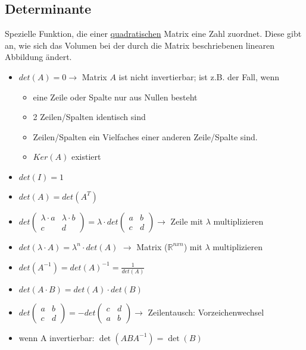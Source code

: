 \subsection{Determinante}

Spezielle Funktion, die einer \underline{quadratischen} Matrix eine Zahl zuordnet. Diese gibt an, wie sich das Volumen bei der durch die Matrix beschriebenen linearen Abbildung ändert. \\


\begin{minipage}{0.65\textwidth}
\begin{itemize}
    \item \(det(A)= 0\rightarrow\) Matrix \(A\) ist nicht invertierbar; ist z.B. der Fall, wenn
    \begin{itemize}
        \item eine Zeile oder Spalte nur aus Nullen besteht
        \item 2 Zeilen/Spalten identisch sind
        \item Zeilen/Spalten ein Vielfaches einer anderen Zeile/Spalte sind.
        \item \(Ker(A)\) existiert
    \end{itemize}
    \item \(det(I) = 1\)
    \item \(det(A) = det(A^T)\)
    \item \(det\begin{pmatrix}
            \lambda \cdot a & \lambda \cdot b \\
            c & d
        \end{pmatrix} = \lambda \cdot det\begin{pmatrix}
            a & b \\
            c & d
        \end{pmatrix} \rightarrow\) Zeile mit \( \lambda \) multiplizieren
    \item \(det(\lambda\cdot A) = \lambda^n \cdot det(A)\) \(\rightarrow\) Matrix (\(\mathbb{R}^{nxn}\)) mit \( \lambda \) multiplizieren
    \item \(det(A^{-1}) = det(A)^{-1}=\frac{1}{det(A)}\)
    \item \(det(A\cdot B) = det(A)\cdot det(B)\)
    \item \(det\begin{pmatrix}
            a & b \\
            c & d
        \end{pmatrix} = -det\begin{pmatrix}
            c & d \\
            a & b
        \end{pmatrix}\rightarrow\) Zeilentausch: Vorzeichenwechsel
    \item wenn A invertierbar: \(\det(ABA^{-1})=\det(B)\)
\end{itemize}
\end{minipage}
